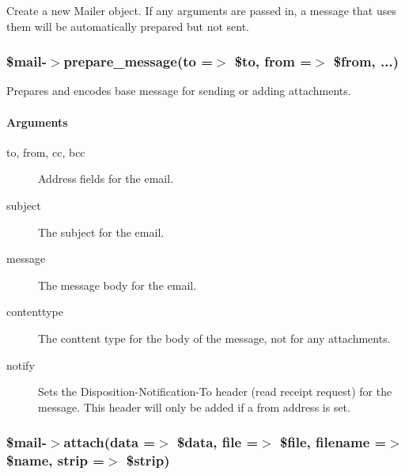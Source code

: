 \begin{description}
\begin{description}
\begin{description}
\begin{description}
\begin{description}
\begin{description}
\begin{description}
\begin{description}
\begin{description}
\begin{description}
Create a new Mailer object.  If any arguments are passed in, a message
that uses them will be automatically prepared but not sent.

\subsubsection*{\$mail-$>$prepare\_message(to =$>$ \$to, from =$>$ \$from, ...)\label{LedgerSMB::Mailer__mail-_prepare_message_to_to_from_from_}}


Prepares and encodes base message for sending or adding attachments.

\paragraph*{Arguments\label{LedgerSMB::Mailer_Arguments}}
\begin{description}

\item[{to, from, cc, bcc}] \mbox{}

Address fields for the email.


\item[{subject}] \mbox{}

The subject for the email.


\item[{message}] \mbox{}

The message body for the email.


\item[{contenttype}] \mbox{}

The conttent type for the body of the message, not for any attachments.


\item[{notify}] \mbox{}

Sets the Disposition-Notification-To header (read receipt request) for the
message.  This header will only be added if a from address is set.

\end{description}
\subsubsection*{\$mail-$>$attach(data =$>$ \$data, file =$>$ \$file,
                     filename =$>$ \$name, strip =$>$ \$strip)\label{LedgerSMB::Mailer__mail-_attach_data_data_file_file_filename_name_strip_strip_}}



\end{description}
\end{description}
\end{description}
\end{description}
\end{description}
\end{description}
\end{description}
\end{description}
\end{description}
\end{description}

